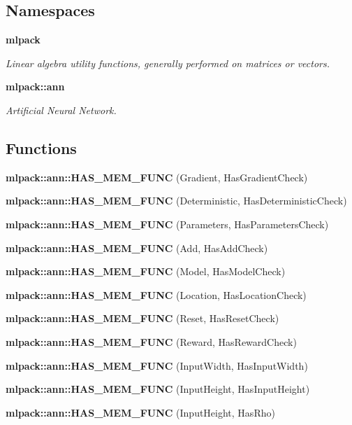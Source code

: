 \subsection*{Namespaces}
\begin{DoxyCompactItemize}
\item 
 {\bf mlpack}
\begin{DoxyCompactList}\small\item\em Linear algebra utility functions, generally performed on matrices or vectors. \end{DoxyCompactList}\item 
 {\bf mlpack\+::ann}
\begin{DoxyCompactList}\small\item\em Artificial Neural Network. \end{DoxyCompactList}\end{DoxyCompactItemize}
\subsection*{Functions}
\begin{DoxyCompactItemize}
\item 
{\bf mlpack\+::ann\+::\+H\+A\+S\+\_\+\+M\+E\+M\+\_\+\+F\+U\+NC} (Gradient, Has\+Gradient\+Check)
\item 
{\bf mlpack\+::ann\+::\+H\+A\+S\+\_\+\+M\+E\+M\+\_\+\+F\+U\+NC} (Deterministic, Has\+Deterministic\+Check)
\item 
{\bf mlpack\+::ann\+::\+H\+A\+S\+\_\+\+M\+E\+M\+\_\+\+F\+U\+NC} (Parameters, Has\+Parameters\+Check)
\item 
{\bf mlpack\+::ann\+::\+H\+A\+S\+\_\+\+M\+E\+M\+\_\+\+F\+U\+NC} (Add, Has\+Add\+Check)
\item 
{\bf mlpack\+::ann\+::\+H\+A\+S\+\_\+\+M\+E\+M\+\_\+\+F\+U\+NC} (Model, Has\+Model\+Check)
\item 
{\bf mlpack\+::ann\+::\+H\+A\+S\+\_\+\+M\+E\+M\+\_\+\+F\+U\+NC} (Location, Has\+Location\+Check)
\item 
{\bf mlpack\+::ann\+::\+H\+A\+S\+\_\+\+M\+E\+M\+\_\+\+F\+U\+NC} (Reset, Has\+Reset\+Check)
\item 
{\bf mlpack\+::ann\+::\+H\+A\+S\+\_\+\+M\+E\+M\+\_\+\+F\+U\+NC} (Reward, Has\+Reward\+Check)
\item 
{\bf mlpack\+::ann\+::\+H\+A\+S\+\_\+\+M\+E\+M\+\_\+\+F\+U\+NC} (Input\+Width, Has\+Input\+Width)
\item 
{\bf mlpack\+::ann\+::\+H\+A\+S\+\_\+\+M\+E\+M\+\_\+\+F\+U\+NC} (Input\+Height, Has\+Input\+Height)
\item 
{\bf mlpack\+::ann\+::\+H\+A\+S\+\_\+\+M\+E\+M\+\_\+\+F\+U\+NC} (Input\+Height, Has\+Rho)
\end{DoxyCompactItemize}



